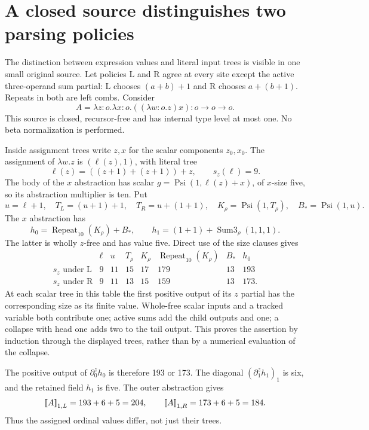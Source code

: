 \section{A closed source distinguishes two parsing policies}
\label{app:policy}

The distinction between expression values and literal input trees is
visible in one small original source. Let policies L and R agree at
every site except the active three-operand sum partial: L chooses
$(a+b)+1$ and R chooses $a+(b+1)$. Repeats in both are left combs.
Consider
\[
 A=\lambda z:o.\lambda x:o.((\lambda w:o.z)x):o\to o\to o.
\]
This source is closed, recursor-free and has internal type level at
most one. No beta normalization is performed.

Inside assignment trees write $z,x$ for the scalar components $z_0,x_0$.
The assignment of $\lambda w.z$ is $(\ell(z),1)$, with literal tree
\[
 \ell(z)=((z+1)+(z+1))+z,\qquad s_z(\ell)=9.
\]
The body of the $x$ abstraction has scalar
$g=\operatorname{Psi}(1,\ell(z)+x)$, of $x$-size five, so its
abstraction multiplier is ten. Put
\[
 u=\ell+1,\quad T_L=(u+1)+1,\quad T_R=u+(1+1),\quad
 K_\rho=\operatorname{Psi}(1,T_\rho),\quad
 B_* =\operatorname{Psi}(1,u).
\]
The $x$ abstraction has
\[
 h_0=\operatorname{Repeat}_{10}(K_\rho)+B_*,\qquad
 h_1=(1+1)+\operatorname{Sum3}_{\rho}(1,1,1).
\]
The latter is wholly $z$-free and has value five. Direct use of the
size clauses gives
\[
\begin{array}{c|rrrrrrr}
 &\ell&u&T_\rho&K_\rho&\operatorname{Repeat}_{10}(K_\rho)&B_*&h_0\\\hline
 s_z\text{ under L}&9&11&15&17&179&13&193\\
 s_z\text{ under R}&9&11&13&15&159&13&173.
\end{array}
\]
At each scalar tree in this table the first positive output of its
$z$ partial has the corresponding size as its finite value.
Whole-free scalar inputs and a tracked variable both contribute one;
active sums add the child outputs and one; a collapse with head one
adds two to the tail output. This proves the assertion by induction
through the displayed trees, rather than by a numerical evaluation of
the collapse.

The positive output of $\partial_0^zh_0$ is therefore 193 or 173.
The diagonal $(\partial_1^zh_1)_1$ is six, and the retained field
$h_1$ is five. The outer abstraction gives
\[
 \mathopen{[\![}A\mathclose{]\!]}_{1,L}=193+6+5=204,\qquad
 \mathopen{[\![}A\mathclose{]\!]}_{1,R}=173+6+5=184.
\]
Thus the assigned ordinal values differ, not just their trees.

